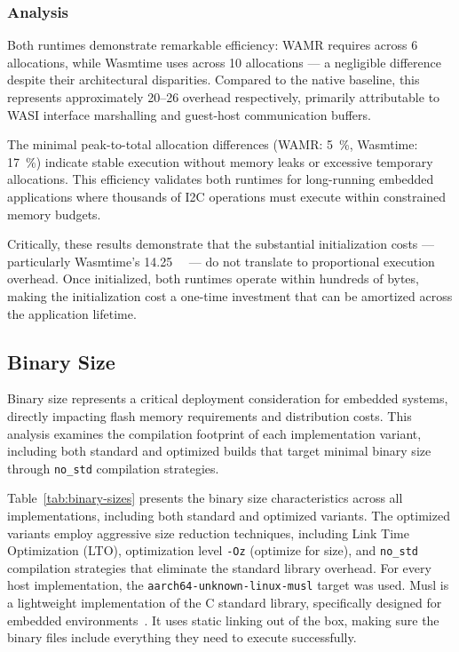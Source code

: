 \subsubsection{Analysis}

Both runtimes demonstrate remarkable efficiency: WAMR requires  across 6 allocations, while Wasmtime uses  across 10 allocations --- a negligible  difference despite their architectural disparities. Compared to the  native baseline, this represents approximately \SIrange[round-precision=0]{20}{26}{\times} overhead respectively, primarily attributable to WASI interface marshalling and guest-host communication buffers.

The minimal peak-to-total allocation differences (WAMR: \SI[round-precision=0]{5}{\percent}, Wasmtime: \SI[round-precision=0]{17}{\percent}) indicate stable execution without memory leaks or excessive temporary allocations. This efficiency validates both runtimes for long-running embedded applications where thousands of I2C operations must execute within constrained memory budgets.

Critically, these results demonstrate that the substantial initialization costs --- particularly Wasmtime's \SI{14.25}{\mega\byte} --- do not translate to proportional execution overhead. Once initialized, both runtimes operate within hundreds of bytes, making the initialization cost a one-time investment that can be amortized across the application lifetime.

\subsection{Binary Size}
\label{subsec:binary-size}

Binary size represents a critical deployment consideration for embedded systems, directly impacting flash memory requirements and distribution costs. This analysis examines the compilation footprint of each implementation variant, including both standard and optimized builds that target minimal binary size through \texttt{no\_std} compilation strategies.

Table~\ref{tab:binary-sizes} presents the binary size characteristics across all implementations, including both standard and optimized variants. The optimized variants employ aggressive size reduction techniques, including Link Time Optimization (LTO), optimization level \texttt{-Oz} (optimize for size), and \texttt{no\_std} compilation strategies that eliminate the standard library overhead. For every host implementation, the \texttt{aarch64-unknown-linux-musl} target was used. Musl is a lightweight implementation of the C standard library, specifically designed for embedded environments~\cite{musl}. It uses static linking out of the box, making sure the binary files include everything they need to execute successfully.

